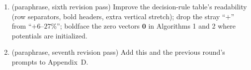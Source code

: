 \documentclass[11pt]{article}
\theoremstyle{remark}
\begin{document}
\begin{enumerate}[leftmargin=2em,itemsep=2pt]
correct the title and author on the GitHub repository README; add
thin spaces between $\in$ and $\mathcal{U}/\mathbb{R}$; replace the
``in the spirit of Crouse'' aside with a proper citation to Crouse
(2016); swap the $\hat\alpha,\hat\beta$ order in Proposition~3 so the
source-side clip is presented first; relabel vanilla Sinkhorn from (V)
to (S) in Table~4; point readers at the cached JSON data files; add a
sentence to Figure~3 explaining greedy's relative speedup at $n=800$;
change ``$+17$--$+37$\%''/``$+6$--$+27$\%'' to ``$+17$ to $+37$\%''/
``$+6$ to $+27$\%'' for readability; turn the empirical decision rule
into a properly formatted table.
\item (paraphrase, sixth revision pass) Improve the decision-rule
table's readability (row separators, bold headers, extra vertical
stretch); drop the stray ``$+$'' from ``$+6$--$27$\%''; boldface the
zero vectors $\mathbf{0}$ in Algorithms 1 and 2 where potentials are
initialized.
\item (paraphrase, seventh revision pass) Add this and the previous
round's prompts to Appendix~D.
\end{enumerate}
\end{document}
